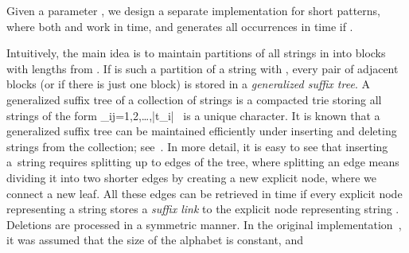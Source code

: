 \documentclass[a4paper]{article}
\theoremstyle{remark}
\begin{document}
Given a parameter , we design a separate implementation for short patterns, where
both  and  work in  time, and  generates
all  occurrences in  time if .

Intuitively, the main idea is to maintain partitions of all strings in  into blocks with lengths from . If  is such
a partition of a string  with , every pair of adjacent blocks  (or  if there is just one block) is stored in a \emph{generalized suffix tree}.
A generalized suffix tree of a collection of strings
 is a compacted trie storing all strings of the form _ij=1,2,\ldots,|t_i| \ is a unique character. It is known that a generalized suffix tree can be maintained
efficiently under inserting and deleting strings from the collection; see~\cite{dictionary}.
In more detail, it is easy to see that inserting a~string  requires splitting up to  edges of the tree, where
splitting an edge means dividing it into two shorter edges by creating a new explicit node,
where we connect a new leaf. All these edges can be retrieved in  time if every explicit
node representing a string  stores a \emph{suffix link} to the explicit node representing string .
Deletions are processed in a symmetric manner.
In the original implementation~\cite{dictionary}, it was assumed that the size of the alphabet is constant, and
\end{document}
